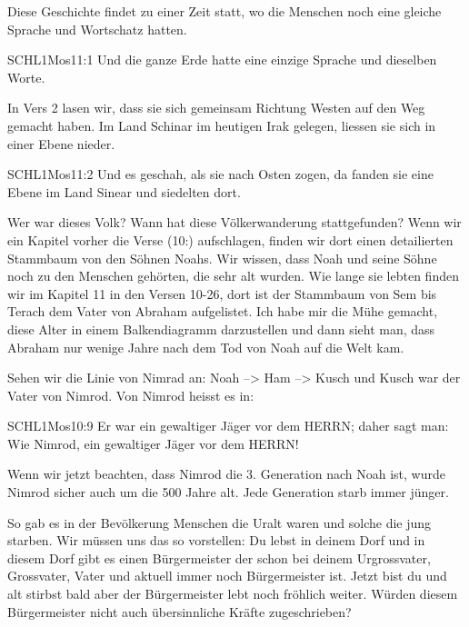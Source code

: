 \documentclass[fontsize=16pt]{mybib}
\begin{document}
    \vspace{1em}
    \begin{otsblock}
    Diese Geschichte findet zu einer Zeit statt, wo die Menschen noch eine gleiche Sprache und Wortschatz hatten.
    \begin{bibelbox}{SCHL}{1Mos}{11:1}
        Und die ganze Erde hatte eine einzige Sprache und dieselben Worte.
    \end{bibelbox}    
    In Vers 2 lasen wir, dass sie sich gemeinsam Richtung Westen auf den Weg gemacht haben. Im Land Schinar im heutigen Irak gelegen, liessen sie sich in einer Ebene nieder.    
    \begin{bibelbox}{SCHL}{1Mos}{11:2}
        Und es geschah, als sie nach Osten zogen, da fanden sie eine Ebene im Land Sinear und siedelten dort.
    \end{bibelbox}
    Wer war dieses Volk? Wann hat diese Völkerwanderung stattgefunden? Wenn wir ein Kapitel vorher die Verse  (10:) aufschlagen, finden wir dort einen detailierten Stammbaum von den Söhnen Noahs. Wir wissen, dass Noah und seine Söhne noch zu den Menschen gehörten, die sehr alt wurden. Wie lange sie lebten finden wir im Kapitel 11 in den Versen 10-26, dort ist der Stammbaum von Sem bis Terach dem Vater von Abraham aufgelistet. Ich habe mir die Mühe gemacht, diese Alter in einem Balkendiagramm darzustellen und dann sieht man, dass Abraham nur wenige Jahre nach dem Tod von Noah auf die Welt kam. 

    Sehen wir die Linie von Nimrad an: Noah --> Ham --> Kusch und Kusch war der Vater von Nimrod.
    Von Nimrod heisst es in:
    \begin{bibelbox}{SCHL}{1Mos}{10:9}
        Er war ein gewaltiger Jäger vor dem HERRN; daher sagt man: Wie Nimrod, ein gewaltiger Jäger vor dem HERRN!
    \end{bibelbox}
    Wenn wir jetzt beachten, dass Nimrod die 3. Generation nach Noah ist, wurde Nimrod sicher auch um die 500 Jahre alt. Jede Generation starb immer jünger. 
\end{otsblock}
\begin{otsblock}
    So gab es in der Bevölkerung Menschen die Uralt waren und solche die jung starben. Wir müssen uns das so vorstellen:  Du lebst in deinem Dorf und in diesem Dorf gibt es einen Bürgermeister der schon bei deinem Urgrossvater, Grossvater, Vater und aktuell immer noch Bürgermeister ist. Jetzt bist du und alt stirbst bald aber der Bürgermeister lebt noch fröhlich weiter. Würden diesem Bürgermeister nicht auch übersinnliche Kräfte zugeschrieben? 
\end{otsblock}
\end{document}
